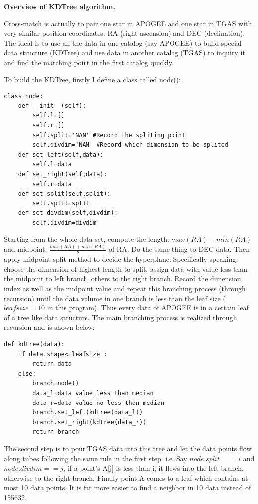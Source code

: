 \documentclass{article}
\begin{document}
\vspace{12pt}
\textbf{Overview of KDTree algorithm.}\par
\vspace{12pt}
	Cross-match is actually to pair one star in APOGEE and one star in TGAS with very similar position coordinates: RA (right ascension) and DEC (declination). The ideal is to use all the data in one catalog (say APOGEE) to build special data structure (KDTree) and use data in another catalog (TGAS) to inquiry it and find the matching point in the first catalog quickly.\par
	 To build the KDTree, firstly I define a class called node():
	 \begin{lstlisting}
class node:
    def __init__(self):
        self.l=[]
        self.r=[]
        self.split='NAN' #Record the spliting point
        self.divdim='NAN' #Record which dimension to be splited
    def set_left(self,data):
        self.l=data
    def set_right(self,data):
        self.r=data
    def set_split(self,split):
        self.split=split
    def set_divdim(self,divdim):
        self.divdim=divdim
    \end{lstlisting}\par
    Starting from the whole data set, compute the length: $max(RA)-min(RA)$ and midpoint: $\frac{max(RA)+min(RA)}{2}$ of RA. Do the same thing to DEC data. Then apply midpoint-split method to decide the hyperplane. Specifically speaking, choose the dimension of highest length to split, assign data with value less than the midpoint to left branch, others to the right branch. Record the dimension index as well as the midpoint value and repeat this branching process (through recursion) until the data volume in one branch is less than the leaf size ($leafsize=10$ in this program). Thus every data of APOGEE is in a certain leaf of a tree like data structure. The main branching process is realized through recursion and is shown below:\par
    \begin{lstlisting}
def kdtree(data):
    if data.shape<=leafsize :  
        return data
    else:
        branch=node()
        data_l=data value less than median
        data_r=data value no less than median
        branch.set_left(kdtree(data_l))
        branch.set_right(kdtree(data_r))
        return branch
    \end{lstlisting}\par
    The second step is to pour TGAS data into this tree and let the data points flow along tubes following the same rule in the first step. i.e. Say $node.split==i$ and $node.divdim==j$, if a point's A[j] is less than i, it flows into the left branch, otherwise to the right branch. Finally point A comes to a leaf which contains at most 10 data points. It is far more easier to find a neighbor in 10 data instead of 155632.\par
\end{document}
